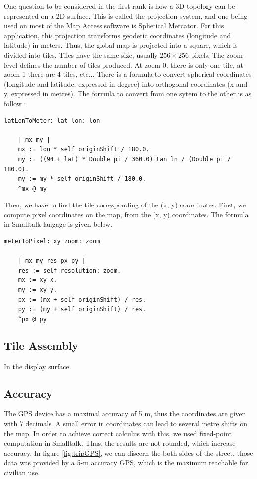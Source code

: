 One question to be considered in the first rank is how a 3D topology can be represented 
on a 2D surface. This is called the projection system, and one being used on most of the 
Map Access software is Spherical Mercator. 
For this application, this projection transforms geodetic coordinates (longitude and latitude) 
in meters. Thus, the global map is projected into a square, which is divided into tiles. 
Tiles have the same size, usually $256 \times 256$ pixels. 
The zoom level defines the number of tiles produced. 
At zoom 0, there is only one tile, at zoom 1 there are 4 tiles, etc... 
There is a formula to convert spherical coordinates (longitude and latitude, expressed in degree) 
into orthogonal coordinates (x and y, expressed in metres). 
The formula to convert from one sytem to the other is as follow :

\begin{lstlisting}
latLonToMeter: lat lon: lon

	| mx my |
	mx := lon * self originShift / 180.0.
	my := ((90 + lat) * Double pi / 360.0) tan ln / (Double pi / 180.0).
	my := my * self originShift / 180.0.
	^mx @ my
\end{lstlisting}

Then, we have to find the tile corresponding of the (x, y) coordinates. 
First, we compute pixel coordinates on the map, from the (x, y) coordinates. 
The formula in Smalltalk langage is given below. 

\begin{lstlisting}
meterToPixel: xy zoom: zoom

	| mx my res px py |
	res := self resolution: zoom.
	mx := xy x.
	my := xy y.
	px := (mx + self originShift) / res.
	py := (my + self originShift) / res.
	^px @ py
\end{lstlisting}

\subsection{Tile Assembly}

In the display surface 

\subsection{Accuracy}

The GPS device has a maximal accuracy of 5 m, thus the coordinates are given with 7 decimals. 
A small error in coordinates can lead to several metre shifts on the map.   
In order to achieve correct calculus with this, we used fixed-point computation in Smalltalk. 
Thus, the results are not rounded, which increase accuracy. 
In figure \ref{fig:tripGPS}, we can discern the both sides of the street, 
those data was provided by a 5-m accuracy GPS, which is the maximum reachable for civilian use. 

